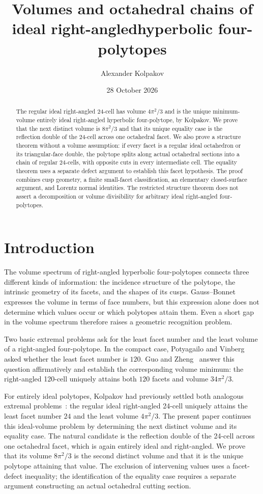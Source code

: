 \documentclass[11pt]{article}
\title{Volumes and octahedral chains of ideal right-angled\linebreak hyperbolic four-polytopes}
\author{Alexander Kolpakov}
\date{28 October 2026}
\theoremstyle{remark}
\begin{document}
\maketitle
\begin{abstract}
The regular ideal right-angled 24-cell has volume $4\pi^2/3$ and is the
unique minimum-volume entirely ideal right-angled hyperbolic
four-polytope, by Kolpakov. We prove that the next distinct volume is
$8\pi^2/3$ and that its unique equality case is the reflection double
of the 24-cell across one octahedral facet. We also prove a structure
theorem without a volume assumption: if every facet is a regular
ideal octahedron or its triangular-face double, the polytope splits
along actual octahedral sections into a chain of regular 24-cells,
with opposite cuts in every intermediate cell. The equality theorem
uses a separate defect argument to establish this facet hypothesis.
The proof combines cusp geometry, a finite small-facet classification,
an elementary closed-surface argument, and Lorentz normal identities.
The restricted structure theorem does not assert a decomposition or
volume divisibility for arbitrary ideal right-angled four-polytopes.
\end{abstract}

\section{Introduction}

The volume spectrum of right-angled hyperbolic four-polytopes connects
three different kinds of information: the incidence structure of the
polytope, the intrinsic geometry of its facets, and the shapes of its
cusps. Gauss--Bonnet expresses the volume in terms of face numbers,
but this expression alone does not determine which values occur or
which polytopes attain them. Even a short gap in the volume spectrum
therefore raises a geometric recognition problem.

Two basic extremal problems ask for the least facet number and the
least volume of a right-angled four-polytope. In the compact case,
Potyagailo and Vinberg~\cite[p.~66]{PV} asked whether the least facet
number is $120$. Guo and Zheng~\cite[Theorem~1.1 and Corollary~1.2]{GuoZheng}
answer this question affirmatively and establish the corresponding
volume minimum: the right-angled 120-cell uniquely attains both
$120$ facets and volume $34\pi^2/3$.

For entirely ideal polytopes, Kolpakov had previously settled both
analogous extremal problems~\cite[Theorems~3 and~4]{Kolpakov}: the
regular ideal right-angled 24-cell uniquely attains the least facet
number $24$ and the least volume $4\pi^2/3$. The present paper
continues this ideal-volume problem by determining the next distinct
volume and its equality case. The natural candidate is the reflection
double of the 24-cell across one octahedral facet, which is again
entirely ideal and right-angled. We prove that its volume $8\pi^2/3$
is the second distinct volume and that it is the unique polytope
attaining that value. The exclusion of intervening values uses a
facet-defect inequality; the identification of the equality case
requires a separate argument constructing an actual octahedral
cutting section.
\end{document}
